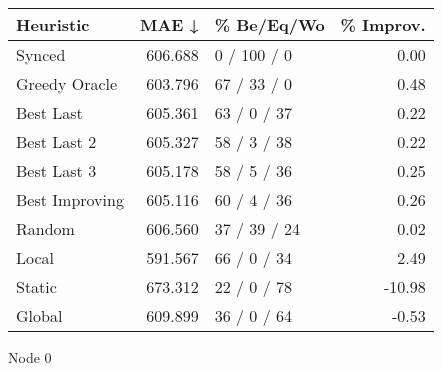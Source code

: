 \begin{tabular}{lrlr}
\toprule
\textbf{Heuristic} & \textbf{MAE ↓} & \textbf{\% Be/Eq/Wo} & \textbf{\% Improv.} \\
\midrule
            Synced &        606.688 &          0 / 100 / 0 &                0.00 \\
     Greedy Oracle &        603.796 &          67 / 33 / 0 &                0.48 \\
         Best Last &        605.361 &          63 / 0 / 37 &                0.22 \\
       Best Last 2 &        605.327 &          58 / 3 / 38 &                0.22 \\
       Best Last 3 &        605.178 &          58 / 5 / 36 &                0.25 \\
    Best Improving &        605.116 &          60 / 4 / 36 &                0.26 \\
            Random &        606.560 &         37 / 39 / 24 &                0.02 \\
             Local &        591.567 &          66 / 0 / 34 &                2.49 \\
            Static &        673.312 &          22 / 0 / 78 &              -10.98 \\
            Global &        609.899 &          36 / 0 / 64 &               -0.53 \\
\bottomrule
\end{tabular}
\caption{Node 0}
\label{tab:iid_lr01_le2_bs2_0}
